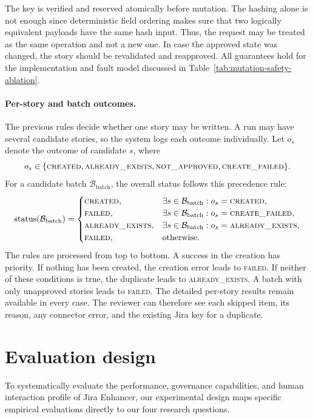 \documentclass[pdflatex,sn-basic]{sn-jnl}
\begin{document}
The key is verified and reserved atomically before mutation. The hashing alone is not enough since deterministic field ordering makes sure that two logically equivalent payloads have the same hash input. Thus, the request may be treated as the same operation and not a new one. In case the approved state was changed, the story should be revalidated and reapproved. All guarantees hold for the implementation and fault model discussed in Table~\ref{tab:mutation-safety-ablation}.

\paragraph{Per-story and batch outcomes.}
The previous rules decide whether one story may be written. A run may have several candidate stories, so the system logs each outcome individually. Let $o_s$ denote the outcome of candidate $s$, where
\[
o_s\in\{\textsc{created},\textsc{already\_exists},\textsc{not\_approved},\textsc{create\_failed}\}.
\]
For a candidate batch $\mathcal{B}_{\mathrm{batch}}$, the overall status follows this precedence rule:
\begin{equation}
\operatorname{status}(\mathcal{B}_{\mathrm{batch}})=
\begin{cases}
\textsc{created}, & \exists s\in \mathcal{B}_{\mathrm{batch}}: o_s=\textsc{created},\\
\textsc{failed}, & \exists s\in \mathcal{B}_{\mathrm{batch}}: o_s=\textsc{create\_failed},\\
\textsc{already\_exists}, & \exists s\in \mathcal{B}_{\mathrm{batch}}: o_s=\textsc{already\_exists},\\
\textsc{failed}, & \text{otherwise}.
\end{cases}
\end{equation}
The rules are processed from top to bottom. A success in the creation has priority. If nothing has been created, the creation error leads to \textsc{failed}. If neither of these conditions is true, the duplicate leads to \textsc{already\_exists}. A batch with only unapproved stories leads to \textsc{failed}. The detailed per-story results remain available in every case. The reviewer can therefore see each skipped item, its reason, any connector error, and the existing Jira key for a duplicate.

\FloatBarrier
\section{Evaluation design}
To systematically evaluate the performance, governance capabilities, and human interaction profile of Jira Enhancer, our experimental design maps specific empirical evaluations directly to our four research questions.
\end{document}
